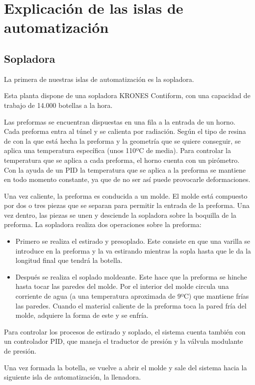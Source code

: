\documentclass[11pt,a4paper,spanish,twoside]{report}
\begin{document}
\chapter{Explicación de las islas de automatización}
\section{Sopladora}
La primera de nuestras islas de automatización es la sopladora.

Esta planta dispone de una sopladora KRONES Contiform, con una capacidad de 
trabajo de 14.000 botellas a la hora.

Las preformas se encuentran dispuestas en una fila a la entrada de un horno. 
Cada preforma entra al túnel y se calienta por radiación. Según el tipo de 
resina de con la que está hecha la preforma y la geometría que se quiere 
conseguir, se aplica una temperatura específica (unos 110ºC de media). Para 
controlar la temperatura que se aplica a cada preforma, el horno cuenta con un
pirómetro. Con la ayuda de un PID la temperatura que se aplica a la preforma 
se mantiene en todo momento constante, ya que de no ser así puede provocarle
deformaciones.

Una vez caliente, la preforma es conducida a un molde. El molde está compuesto 
por dos o tres piezas que se separan para permitir la entrada de la preforma. 
Una vez dentro, las piezas se unen y desciende la sopladora sobre la boquilla 
de la preforma. La sopladora realiza dos operaciones sobre la preforma:
\begin{itemize}
\item Primero se realiza el estirado y presoplado. Este consiste en que una 
varilla se introduce en la preforma y la va estirando mientras la sopla hasta 
que le da la longitud final que tendrá la botella.
\item Después se realiza el soplado moldeante. Este hace que la preforma se
hinche hasta tocar las paredes del molde. Por el interior del molde circula 
una corriente de agua (a una temperatura aproximada de 9ºC) que mantiene frías 
las paredes. Cuando el material caliente de la preforma toca la pared fría del 
molde, adquiere la forma de este y se enfría.
\end{itemize}
Para controlar los procesos de estirado y soplado, el sistema cuenta también 
con un controlador PID, que maneja el traductor de presión y la válvula 
modulante de presión.

Una vez formada la botella, se vuelve a abrir el molde y sale del sistema hacia 
la siguiente isla de automatización, la llenadora.
\end{document}
